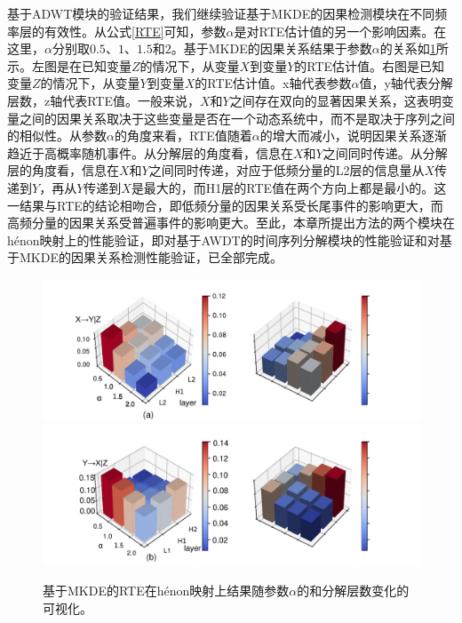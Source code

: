 基于ADWT模块的验证结果，我们继续验证基于MKDE的因果检测模块在不同频率层的有效性。从公式\ref{RTE}可知，参数$\alpha$是对RTE估计值的另一个影响因素。在这里，$\alpha$分别取$0.5$、$1$、$1.5$和$2$。基于MKDE的因果关系结果于参数$\alpha$的关系如\ref{figure4}所示。左图是在已知变量$Z$的情况下，从变量$X$到变量$Y$的RTE估计值。右图是已知变量$Z$的情况下，从变量$Y$到变量$X$的RTE估计值。x轴代表参数$\alpha$值，y轴代表分解层数，z轴代表RTE值。一般来说，$X$和$Y$之间存在双向的显著因果关系，这表明变量之间的因果关系取决于这些变量是否在一个动态系统中，而不是取决于序列之间的相似性。从参数$\alpha$的角度来看，RTE值随着$\alpha$的增大而减小，说明因果关系逐渐趋近于高概率随机事件。从分解层的角度看，信息在$X$和$Y$之间同时传递。从分解层的角度看，信息在$X$和$Y$之间同时传递，对应于低频分量的L2层的信息量从$X$传递到$Y$，再从$Y$传递到$X$是最大的，而H1层的RTE值在两个方向上都是最小的。这一结果与RTE的结论相吻合，即低频分量的因果关系受长尾事件的影响更大，而高频分量的因果关系受普遍事件的影响更大。至此，本章所提出方法的两个模块在h\'{e}non映射上的性能验证，即对基于AWDT的时间序列分解模块的性能验证和对基于MKDE的因果关系检测性能验证，已全部完成。
\begin{figure}[!ht]
\begin{center}
\includegraphics[scale=0.5]{./ch3/fig3_4.pdf}
\includegraphics[scale=0.5]{./ch3/fig3_5.pdf}
\caption{基于MKDE的RTE在h\'{e}non映射上结果随参数$\alpha$的和分解层数变化的可视化。 } \label{figure4}
\end{center}
\end{figure}

